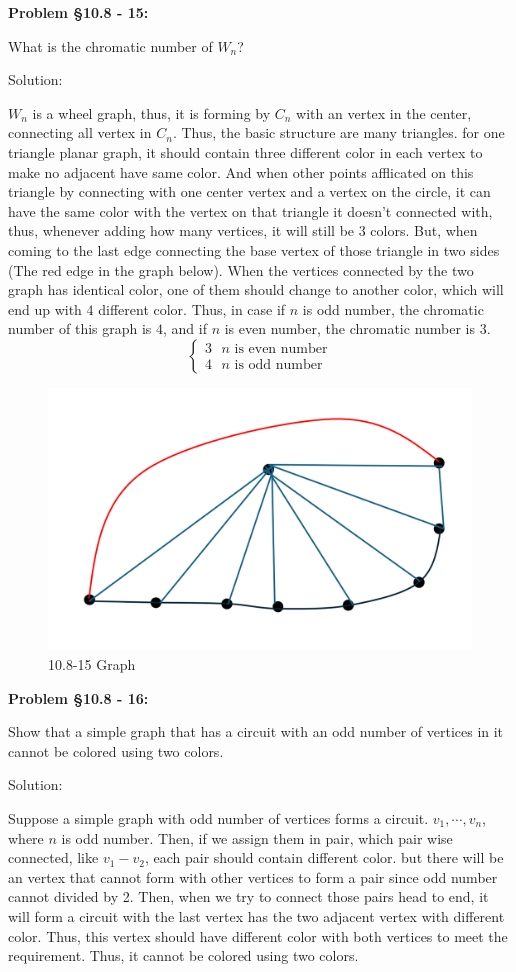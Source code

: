 \documentclass{article}
\newenvironment{problem}[1]
{\begin{mdframed}[default]
\textbf{Problem #1:}
}
{\end{mdframed}
}
\begin{document}
\begin{problem}{\S 10.8 - 15}
What is the chromatic number of $W_n$?

Solution:

$W_n$ is a wheel graph, thus, it is forming by $C_n$ with an vertex in the center, connecting all vertex in $C_n$. Thus, the basic structure are many triangles. for one triangle planar graph, it should contain three different color in each vertex to make no adjacent have same color. And when other points afflicated on this triangle by connecting with one center vertex and a vertex on the circle, it can have the same color with the vertex on that triangle it doesn't connected with, thus, whenever adding how many vertices, it will still be $3$ colors. But, when coming to the last edge connecting the base vertex of those triangle in two sides (The red edge in the graph below). When the vertices connected by the two graph has identical color, one of them should change to another color, which will end up with $4$ different color. Thus, in case if $n$ is odd number, the chromatic number of this graph is $4$, and if $n$ is even number, the chromatic number is $3$.
\[\begin{cases}
    3 \text{ $n$ is even number}\\
    4 \text{ $n$ is odd number}
\end{cases}\]
\end{problem}
\begin{figure}[h!]
    \centering
    \includegraphics[width=0.5\linewidth]{屏幕截图 2024-12-04 124324.png}
    \caption{10.8-15 Graph}
    \label{fig:enter-label}
\end{figure}
\begin{problem}{\S 10.8 - 16}
Show that a simple graph that has a circuit with an odd
number of vertices in it cannot be colored using two colors.

Solution:

Suppose a simple graph with odd number of vertices forms a circuit. $v_1,\cdots,v_n$, where $n$ is odd number. Then, if we assign them in pair, which pair wise connected, like $v_1-v_2$, each pair should contain different color. but there will be an vertex that cannot form with other vertices to form a pair since odd number cannot divided by 2. Then, when we try to connect those pairs head to end, it will form a circuit with the last vertex has the two adjacent vertex with different color. Thus, this vertex should have different color with both vertices to meet the requirement. Thus, it cannot be colored using two colors.
\end{problem}
\end{document}
